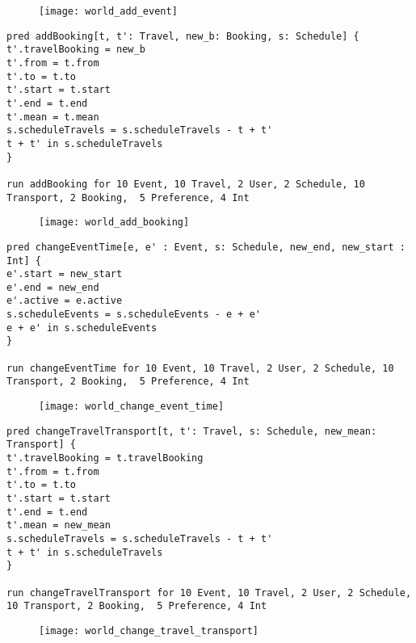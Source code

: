 \begin{figure}[H]
	\centering
	\texttt{[image: world\_add\_event]}
\end{figure}

\begin{lstlisting}[language=alloy]
pred addBooking[t, t': Travel, new_b: Booking, s: Schedule] {
t'.travelBooking = new_b
t'.from = t.from
t'.to = t.to
t'.start = t.start
t'.end = t.end
t'.mean = t.mean
s.scheduleTravels = s.scheduleTravels - t + t'
t + t' in s.scheduleTravels
}

run addBooking for 10 Event, 10 Travel, 2 User, 2 Schedule, 10 Transport, 2 Booking,  5 Preference, 4 Int
\end{lstlisting}

\begin{figure}[H]
	\centering
	\texttt{[image: world\_add\_booking]}
\end{figure}

\begin{lstlisting}[language=alloy]
pred changeEventTime[e, e' : Event, s: Schedule, new_end, new_start : Int] {
e'.start = new_start
e'.end = new_end
e'.active = e.active
s.scheduleEvents = s.scheduleEvents - e + e'
e + e' in s.scheduleEvents
}

run changeEventTime for 10 Event, 10 Travel, 2 User, 2 Schedule, 10 Transport, 2 Booking,  5 Preference, 4 Int
\end{lstlisting}

\begin{figure}[H]
	\centering
	\texttt{[image: world\_change\_event\_time]}
\end{figure}


\begin{lstlisting}[language=alloy]
pred changeTravelTransport[t, t': Travel, s: Schedule, new_mean: Transport] {
t'.travelBooking = t.travelBooking
t'.from = t.from
t'.to = t.to
t'.start = t.start
t'.end = t.end
t'.mean = new_mean
s.scheduleTravels = s.scheduleTravels - t + t'
t + t' in s.scheduleTravels
}

run changeTravelTransport for 10 Event, 10 Travel, 2 User, 2 Schedule, 10 Transport, 2 Booking,  5 Preference, 4 Int
\end{lstlisting}

\begin{figure}[H]
	\centering
	\texttt{[image: world\_change\_travel\_transport]}
\end{figure}